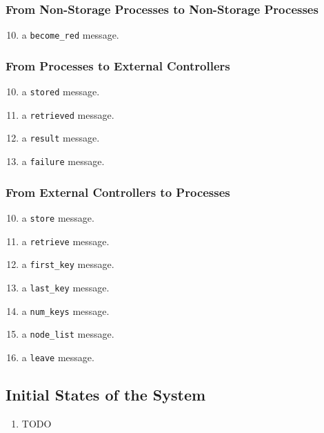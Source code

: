 \documentclass[11pt]{article}
\begin{document}
\subsubsection{From Non-Storage Processes to Non-Storage Processes}
\begin{enumerate}[M1]
\setcounter{enumi}{9}
\newcommand{\becomeRed}{\texttt{become\_red}}
\item a {\becomeRed} message.
\end{enumerate}


\subsubsection{From Processes to External Controllers}
\begin{enumerate}[M1]
\setcounter{enumi}{9}
\newcommand{\stored}{\texttt{stored}}
\newcommand{\retrieved}{\texttt{retrieved}}
\newcommand{\result}{\texttt{result}}
\newcommand{\failure}{\texttt{failure}}

\item a {\stored} message.
\item a {\retrieved} message.
\item a {\result} message.
\item a {\failure} message.
\end{enumerate}

\subsubsection{From External Controllers to Processes}
\begin{enumerate}[M1]
\setcounter{enumi}{9}
\newcommand{\store}{\texttt{store}}
\newcommand{\retrieve}{\texttt{retrieve}}
\newcommand{\firstKey}{\texttt{first\_key}}
\newcommand{\lastKey}{\texttt{last\_key}}
\newcommand{\numKeys}{\texttt{num\_keys}}
\newcommand{\nodeList}{\texttt{node\_list}}
\newcommand{\leave}{\texttt{leave}}

\item a {\store} message.
\item a {\retrieve} message.
\item a {\firstKey} message.
\item a {\lastKey} message.
\item a {\numKeys} message.
\item a {\nodeList} message.
\item a {\leave} message.
\end{enumerate}

\subsection{Initial States of the System}
\begin{enumerate}
\item TODO
\end{enumerate}
\end{document}
